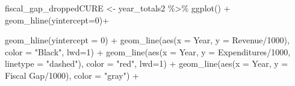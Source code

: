 \documentclass[
  letterpaper,
  DIV=11,
  numbers=noendperiod]{scrreport}
\newenvironment{Shaded}{\begin{snugshade}}{\end{snugshade}}
\newcommand{\AttributeTok}[1]{\textcolor[rgb]{0.40,0.45,0.13}{#1}}
\newcommand{\DecValTok}[1]{\textcolor[rgb]{0.68,0.00,0.00}{#1}}
\newcommand{\FunctionTok}[1]{\textcolor[rgb]{0.28,0.35,0.67}{#1}}
\newcommand{\NormalTok}[1]{\textcolor[rgb]{0.00,0.23,0.31}{#1}}
\newcommand{\OtherTok}[1]{\textcolor[rgb]{0.00,0.23,0.31}{#1}}
\newcommand{\SpecialCharTok}[1]{\textcolor[rgb]{0.37,0.37,0.37}{#1}}
\newcommand{\StringTok}[1]{\textcolor[rgb]{0.13,0.47,0.30}{#1}}
\begin{document}
\begin{Shaded}
\begin{Highlighting}[]
\NormalTok{fiscal\_gap\_droppedCURE }\OtherTok{\textless{}{-}}\NormalTok{ year\_totals2 }\SpecialCharTok{\%\textgreater{}\%}  
  \FunctionTok{ggplot}\NormalTok{() }\SpecialCharTok{+}
  \FunctionTok{geom\_hline}\NormalTok{(}\AttributeTok{yintercept=}\DecValTok{0}\NormalTok{)}\SpecialCharTok{+}
  
    \FunctionTok{geom\_hline}\NormalTok{(}\AttributeTok{yintercept =} \DecValTok{0}\NormalTok{) }\SpecialCharTok{+}
  \FunctionTok{geom\_line}\NormalTok{(}\FunctionTok{aes}\NormalTok{(}\AttributeTok{x =}\NormalTok{ Year, }\AttributeTok{y =}\NormalTok{ Revenue}\SpecialCharTok{/}\DecValTok{1000}\NormalTok{), }\AttributeTok{color =} \StringTok{"Black"}\NormalTok{, }\AttributeTok{lwd=}\DecValTok{1}\NormalTok{) }\SpecialCharTok{+}
  \FunctionTok{geom\_line}\NormalTok{(}\FunctionTok{aes}\NormalTok{(}\AttributeTok{x =}\NormalTok{ Year, }\AttributeTok{y =}\NormalTok{ Expenditures}\SpecialCharTok{/}\DecValTok{1000}\NormalTok{, }\AttributeTok{linetype =} \StringTok{"dashed"}\NormalTok{), }\AttributeTok{color =} \StringTok{"red"}\NormalTok{, }\AttributeTok{lwd=}\DecValTok{1}\NormalTok{) }\SpecialCharTok{+}
  \FunctionTok{geom\_line}\NormalTok{(}\FunctionTok{aes}\NormalTok{(}\AttributeTok{x =}\NormalTok{ Year, }\AttributeTok{y =} \StringTok{\textasciigrave{}}\AttributeTok{Fiscal Gap}\StringTok{\textasciigrave{}}\SpecialCharTok{/}\DecValTok{1000}\NormalTok{), }\AttributeTok{color =} \StringTok{"gray"}\NormalTok{) }\SpecialCharTok{+}
  

\end{Highlighting}
\end{Shaded}
\end{document}
